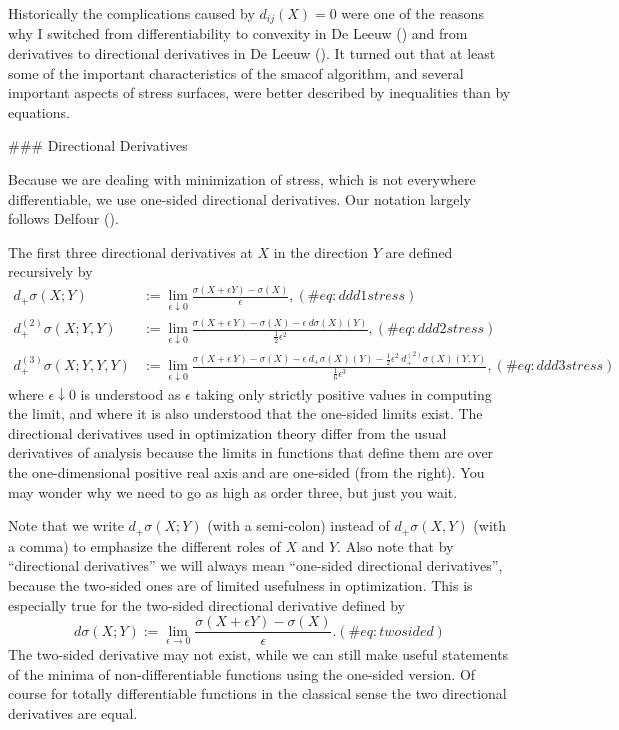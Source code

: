 \documentclass[
  12pt,
  letterpaper,
  DIV=11,
  numbers=noendperiod]{scrreprt}
\theoremstyle{remark}
\begin{document}
Historically the complications caused by \(d_{ij}(X)=0\) were one of the
reasons why I switched from differentiability to convexity in De Leeuw
() and from derivatives to directional
derivatives in De Leeuw (). It turned
out that at least some of the important characteristics of the smacof
algorithm, and several important aspects of stress surfaces, were better
described by inequalities than by equations.

\#\#\# Directional Derivatives

Because we are dealing with minimization of stress, which is not
everywhere differentiable, we use one-sided directional derivatives. Our
notation largely follows Delfour ().

The first three directional derivatives at \(X\) in the direction \(Y\)
are defined recursively by \begin{align}
d_+\sigma(X;Y)&:=\lim_{\epsilon\downarrow 0}\frac{\sigma(X+\epsilon Y)-\sigma(X)}{\epsilon},
(\#eq:ddd1stress)\\
d_+^{(2)}\sigma(X;Y,Y)&:=\lim_{\epsilon\downarrow 0}\frac{\sigma(X+\epsilon\ Y)-\sigma(X)-\epsilon\ d\sigma(X)(Y)}{\frac12\epsilon^2},
(\#eq:ddd2stress)\\
d_+^{(3)}\sigma(X;Y,Y,Y)&:=\lim_{\epsilon\downarrow 0}\frac{\sigma(X+\epsilon\ Y)-\sigma(X)-\epsilon\ d_+\sigma(X)(Y)-\frac12\epsilon^2\ d_+^{(2)}\sigma(X)(Y,Y)}{\frac16\epsilon^3},
(\#eq:ddd3stress)
\end{align} where \(\epsilon\downarrow 0\) is understood as \(\epsilon\)
taking only strictly positive values in computing the limit, and where
it is also understood that the one-sided limits exist. The directional
derivatives used in optimization theory differ from the usual
derivatives of analysis because the limits in functions that define them
are over the one-dimensional positive real axis and are one-sided (from
the right). You may wonder why we need to go as high as order three, but
just you wait.

Note that we write \(d_+\sigma(X;Y)\) (with a semi-colon) instead of
\(d_+\sigma(X,Y)\) (with a comma) to emphasize the different roles of
\(X\) and \(Y\). Also note that by ``directional derivatives'' we will
always mean ``one-sided directional derivatives'', because the two-sided
ones are of limited usefulness in optimization. This is especially true
for the two-sided directional derivative defined by \begin{equation}
d\sigma(X;Y):=\lim_{\epsilon\rightarrow 0}\frac{\sigma(X+\epsilon Y)-\sigma(X)}{\epsilon}.
(\#eq:twosided)
\end{equation} The two-sided derivative may not exist, while we can
still make useful statements of the minima of non-differentiable
functions using the one-sided version. Of course for totally
differentiable functions in the classical sense the two directional
derivatives are equal.
\end{document}
